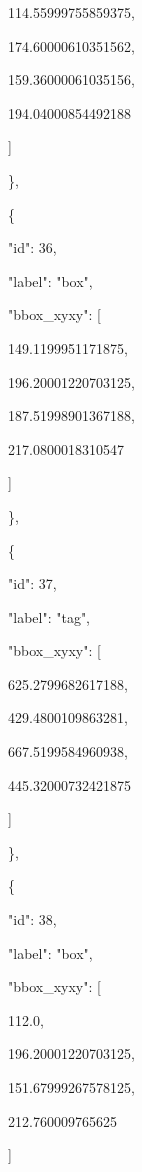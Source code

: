 \documentclass[10pt,a4paper]{article}
\begin{document}
        114.55999755859375,\allowbreak{}\par
        174.60000610351562,\allowbreak{}\par
        159.36000061035156,\allowbreak{}\par
        194.04000854492188\par
      ]\par
    \},\allowbreak{}\par
    \{\par
      "id":\allowbreak{} 36,\allowbreak{}\par
      "label":\allowbreak{} "box",\allowbreak{}\par
      "bbox\_xyxy":\allowbreak{} [\par
        149.1199951171875,\allowbreak{}\par
        196.20001220703125,\allowbreak{}\par
        187.51998901367188,\allowbreak{}\par
        217.0800018310547\par
      ]\par
    \},\allowbreak{}\par
    \{\par
      "id":\allowbreak{} 37,\allowbreak{}\par
      "label":\allowbreak{} "tag",\allowbreak{}\par
      "bbox\_xyxy":\allowbreak{} [\par
        625.2799682617188,\allowbreak{}\par
        429.4800109863281,\allowbreak{}\par
        667.5199584960938,\allowbreak{}\par
        445.32000732421875\par
      ]\par
    \},\allowbreak{}\par
    \{\par
      "id":\allowbreak{} 38,\allowbreak{}\par
      "label":\allowbreak{} "box",\allowbreak{}\par
      "bbox\_xyxy":\allowbreak{} [\par
        112.0,\allowbreak{}\par
        196.20001220703125,\allowbreak{}\par
        151.67999267578125,\allowbreak{}\par
        212.760009765625\par
      ]\par
\end{document}
